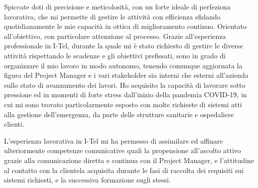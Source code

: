 
\begin{cvparagraph}
	Spiccate doti di precisione e meticolosità, con un forte ideale di perfeziona lavorativa, che mi permette di gestire le	attività con efficienza sfidando quotidianamente le mie capacità in ottica di miglioramento continuo. Orientato all'obiettivo, con particolare attenzione al processo. Grazie all'esperienza professionale in I-Tel, durante la quale mi è stato richiesto di gestire le diverse attività rispettando le scadenze e gli obiettivi prefissati, sono in grado di organizzare il mio lavoro in modo autonomo, tenendo comunque aggiornata la figura del Project Manager e i vari stakeholder sia interni che esterni all'azienda sullo stato di avanzamento dei lavori. Ho acquisito la capacità di lavorare sotto pressione ed in momenti di forte stress dall'inizio della pandemia COVID-19, in cui mi sono trovato particolarmente esposto con molte richieste di sistemi atti alla gestione dell'emergenza, da parte	delle strutture sanitarie e ospedaliere clienti.
\end{cvparagraph}


\begin{cvparagraph}
	L'esperienza lavorativa in I-Tel mi ha permesso di assimilare ed affinare ulteriormente competenze comunicative quali la propensione all'ascolto attivo grazie alla comunicazione diretta e continua con il Project Manager, e l'attitudine al contatto con la clientela acquisita durante le fasi di raccolta dei requisiti sui sistemi richiesti, e la successiva formazione sugli stessi.
\end{cvparagraph}


